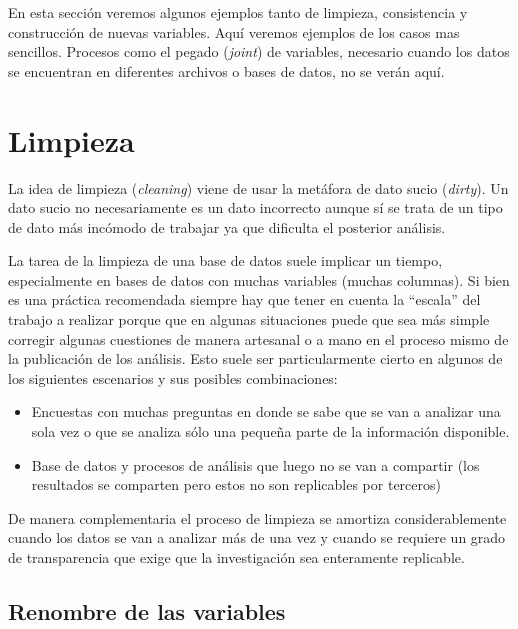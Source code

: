 \documentclass[
  letterpaper,
  DIV=11,
  numbers=noendperiod]{scrreprt}
\begin{document}
En esta sección veremos algunos ejemplos tanto de limpieza, consistencia
y construcción de nuevas variables. Aquí veremos ejemplos de los casos
mas sencillos. Procesos como el pegado (\emph{joint}) de variables,
necesario cuando los datos se encuentran en diferentes archivos o bases
de datos, no se verán aquí.

\hypertarget{limpieza}{%
\section{Limpieza}\label{limpieza}}

La idea de limpieza (\emph{cleaning}) viene de usar la metáfora de dato
sucio (\emph{dirty}). Un dato sucio no necesariamente es un dato
incorrecto aunque sí se trata de un tipo de dato más incómodo de
trabajar ya que dificulta el posterior análisis.

La tarea de la limpieza de una base de datos suele implicar un tiempo,
especialmente en bases de datos con muchas variables (muchas columnas).
Si bien es una práctica recomendada siempre hay que tener en cuenta la
``escala'' del trabajo a realizar porque que en algunas situaciones
puede que sea más simple corregir algunas cuestiones de manera artesanal
o a mano en el proceso mismo de la publicación de los análisis. Esto
suele ser particularmente cierto en algunos de los siguientes escenarios
y sus posibles combinaciones:

\begin{itemize}
\item
  Encuestas con muchas preguntas en donde se sabe que se van a analizar
  una sola vez o que se analiza sólo una pequeña parte de la información
  disponible.
\item
  Base de datos y procesos de análisis que luego no se van a compartir
  (los resultados se comparten pero estos no son replicables por
  terceros)
\end{itemize}

De manera complementaria el proceso de limpieza se amortiza
considerablemente cuando los datos se van a analizar más de una vez y
cuando se requiere un grado de transparencia que exige que la
investigación sea enteramente replicable.

\hypertarget{renombre-de-las-variables}{%
\subsection{Renombre de las variables}\label{renombre-de-las-variables}}
\end{document}
